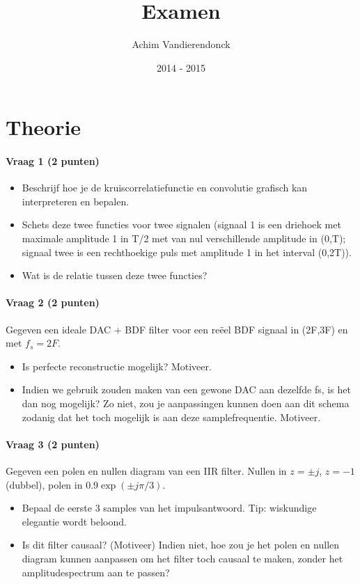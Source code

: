 \documentclass[a4paper]{article}
\title{Examen}
\author{Achim Vandierendonck}
\date{2014 - 2015}
\begin{document}
\maketitle

\section{Theorie}
\paragraph{Vraag 1 (2 punten)}
\begin{itemize}
	\item Beschrijf hoe je de kruiscorrelatiefunctie en convolutie grafisch kan interpreteren en bepalen.
	\item Schets deze twee functies voor twee signalen (signaal 1 is een driehoek met maximale amplitude 1 in T/2 met van nul verschillende amplitude in (0,T); signaal twee is een rechthoekige puls met amplitude 1 in het interval (0,2T)). 
	\item Wat is de relatie tussen deze twee functies?
\end{itemize}

\paragraph{Vraag 2 (2 punten)}
Gegeven een ideale DAC + BDF filter voor een reëel BDF signaal in (2F,3F) en met $f_s = 2F$.
\begin{itemize}
	\item Is perfecte reconstructie mogelijk? Motiveer.
	\item Indien we gebruik zouden maken van een gewone DAC aan dezelfde fs, is het dan nog mogelijk? Zo niet, zou je aanpassingen kunnen doen aan dit schema zodanig dat het toch mogelijk is aan deze samplefrequentie. Motiveer.
\end{itemize}

\paragraph{Vraag 3 (2 punten)}
Gegeven een polen en nullen diagram van een IIR filter. Nullen in $z=\pm j$, $z=-1$ (dubbel), polen in $0.9\exp(\pm j\pi/3)$.
\begin{itemize}
	\item Bepaal de eerste 3 samples van het impulsantwoord. Tip: wiskundige elegantie wordt beloond.
	\item Is dit filter causaal? (Motiveer) Indien niet, hoe zou je het polen en nullen diagram kunnen aanpassen om het filter toch causaal te maken, zonder het amplitudespectrum aan te passen?
\end{itemize}
\end{document}
